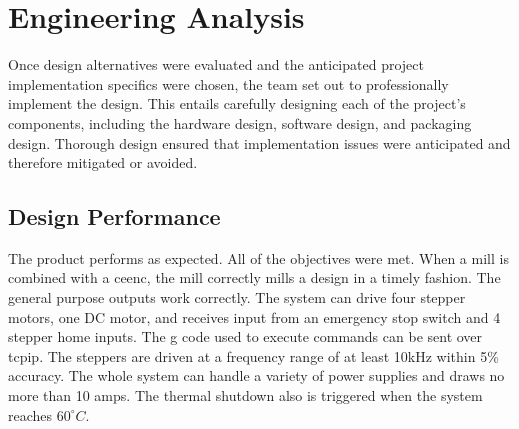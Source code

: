 \chapter{Engineering Analysis}

Once design alternatives were evaluated and the anticipated project implementation specifics were chosen, the team set out to professionally implement the design.
This entails carefully designing each of the project's components, including the hardware design, software design, and packaging design.
Thorough design ensured that implementation issues were anticipated and therefore mitigated or avoided.






\section{Design Performance}
The product performs as expected.
All of the objectives were met.
When a mill is combined with a \gls{ceenc}, the mill correctly mills a design in a timely fashion. 
The general purpose outputs work correctly.
The system can drive four stepper motors, one DC motor, and receives input from an emergency stop switch and 4 stepper home inputs.
The g code used to execute commands can be sent over \gls{tcpip}.
The steppers are driven at a frequency range of at least 10kHz within 5\% accuracy.
The whole system can handle a variety of power supplies and draws no more than 10 amps.
The thermal shutdown also is triggered when the system reaches $60^{\circ}C$.